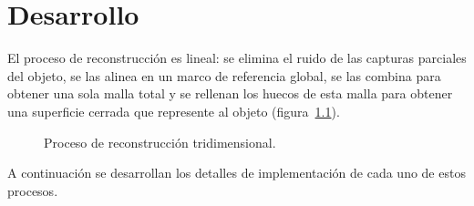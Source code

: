 \chapter{\label{part:desarrollo}Desarrollo}
El proceso de reconstrucción es lineal:
se elimina el ruido de las capturas parciales del objeto,
se las alinea en un marco de referencia global,
se las combina para obtener una sola malla total
y se rellenan los huecos de esta malla para obtener una superficie cerrada
que represente al objeto (figura~\ref{fig:proceso_de_reconstrucción}).

\begin{figure}[h]
	\centering
	\begin{scaletikzpicturetowidth}{\linewidth}
	
	\end{scaletikzpicturetowidth}
	\caption[Proceso de reconstrucción tridimensional]{\label{fig:proceso_de_reconstrucción}Proceso de reconstrucción tridimensional.}
\end{figure}

A continuación se desarrollan los detalles de implementación de cada uno de estos procesos.






